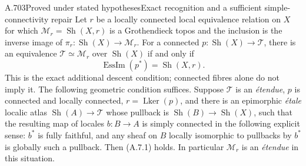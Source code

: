\begin{saresult}{A.703}{Proved under stated hypotheses}{Exact recognition and a sufficient simple-connectivity repair}
Let $r$ be a locally connected local equivalence relation on $X$ for
which $\mathcal M_r=\operatorname{Sh}(X,r)$ is a Grothendieck topos
and the inclusion is the inverse image of
$\pi_r:\operatorname{Sh}(X)\to\mathcal M_r$.
For a connected $p:\operatorname{Sh}(X)\to\mathcal T$, there is an
equivalence $\mathcal T\simeq\mathcal M_r$ over
$\operatorname{Sh}(X)$ if and only if
\[
 \operatorname{EssIm}(p^*)=\operatorname{Sh}(X,r).
 \tag{A.7.1}
\]
This is the exact additional descent condition; connected fibres alone
do not imply it. The following geometric condition suffices. Suppose
$\mathcal T$ is an \emph{\'etendue}, $p$ is connected and locally
connected, $r=\operatorname{Lker}(p)$, and there is an epimorphic
\emph{\'etale} localic atlas $\operatorname{Sh}(A)\to\mathcal T$
whose pullback is $\operatorname{Sh}(B)\to\operatorname{Sh}(X)$,
such that the resulting map of locales $b:B\to A$ is simply connected
in the following explicit sense: $b^*$ is fully faithful, and any
sheaf on $B$ locally isomorphic to pullbacks by $b^*$ is globally such
a pullback. Then (A.7.1) holds. In particular $\mathcal M_r$ is an
\emph{\'etendue} in this situation.
\end{saresult}

